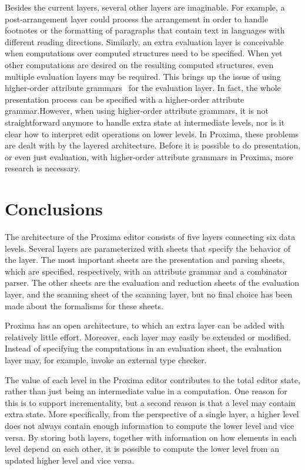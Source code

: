 Besides the current layers, several other layers are imaginable. For example, a post-arrangement layer could process the arrangement in order to handle footnotes or the formatting of paragraphs that contain text in languages with different reading directions. Similarly, an extra evaluation layer is conceivable when computations over computed structures need to be specified. When yet other computations are desired on the resulting computed structures, even multiple evaluation layers may be required. This brings up the issue of using higher-order attribute grammars~\cite{vogt89Hags} for the evaluation layer. \bc In fact, the whole presentation process can be specified with a higher-order attribute grammar.\ec However, when using higher-order attribute grammars, it is not straightforward anymore to handle extra state at intermediate levels, nor is it clear how to interpret edit operations on lower levels. In Proxima, these problems are dealt with by the layered architecture. Before it is possible to do presentation, or even just evaluation, with higher-order attribute grammars in Proxima, more research is necessary.

\section{Conclusions}

The architecture of the Proxima editor consists of five layers connecting six data levels. Several layers are parameterized with sheets that specify the behavior of the layer. The most important sheets are the presentation and parsing sheets, which are specified, respectively, with an attribute grammar and a combinator parser. The other sheets are the evaluation and reduction sheets of the evaluation layer, and the scanning sheet of the scanning layer, but no final choice has been made about the formalisms for these sheets.

Proxima has an open architecture, to which an extra layer can be added with relatively little effort. Moreover, each layer may easily be extended or modified. Instead of specifying the computations in an evaluation sheet, the evaluation layer may, for example, invoke an external type checker. 

The value of each level in the Proxima editor contributes to the total editor state, rather than just being an intermediate value in a computation. One reason for this is to support incrementality, but a second reason is that a level may contain extra state. More specifically, from the perspective of a single layer, a higher level does not always contain enough information to compute the lower level and vice versa. By storing both layers, together with information on how elements in each level depend on each other, it is possible to compute the lower level from an updated higher level and vice versa.

